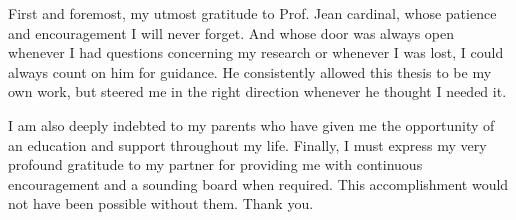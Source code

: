 \documentclass[
    english, %
    onehalfspacing, %
    headsepline, %
    parskip, %
]{MastersDoctoralThesis} %
\theoremstyle{definition}
\theoremstyle{remark}
\theoremstyle{plain}
\numberwithin{theorem}{section}
\begin{document}
    \begin{acknowledgements}
        \addchaptertocentry{\acknowledgementname} %
        First and foremost, my utmost gratitude to Prof. Jean cardinal, whose patience and encouragement I will never forget.
        And whose door was always open whenever I had questions concerning my research or whenever I was lost, I could always
        count on him for guidance. He consistently allowed this thesis to be my own work, but steered me in the right direction whenever
        he thought I needed it.

        I am also deeply indebted to my parents who have given me the opportunity of an education and support throughout my life.
        Finally, I must express my very profound gratitude to my partner for providing me with continuous encouragement
        and a sounding board when required. This accomplishment would not have been possible without them. Thank you.

    \end{acknowledgements}

    \hypersetup{linkcolor=black}
    \tableofcontents %




\end{document}
